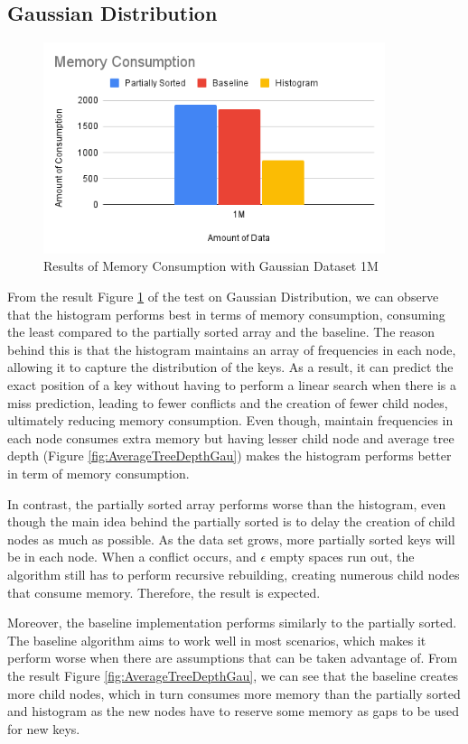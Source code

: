 \subsection{Gaussian Distribution}
\begin{figure}[H]
    \centering
    \includegraphics[width=100mm,scale=1]{Figures/MemoryGaussian.png}
    \caption{
     Results of Memory Consumption with Gaussian Dataset 1M
    }
    \label{fig:MemoryGaussian}
\end{figure}
From the result Figure \ref{fig:MemoryGaussian} of the test on Gaussian Distribution, we can observe that the histogram performs best in terms of memory consumption, consuming the least compared to the partially sorted array and the baseline. The reason behind this is that the histogram maintains an array of frequencies in each node, allowing it to capture the distribution of the keys. As a result, it can predict the exact position of a key without having to perform a linear search when there is a miss prediction, leading to fewer conflicts and the creation of fewer child nodes, ultimately reducing memory consumption. Even though, maintain frequencies in each node consumes extra memory but having lesser child node and average tree depth (Figure \ref{fig:AverageTreeDepthGau}) makes the histogram performs better in term of memory consumption.

In contrast, the partially sorted array performs worse than the histogram, even though the main idea behind the partially sorted is to delay the creation of child nodes as much as possible. As the data set grows, more partially sorted keys will be in each node. When a conflict occurs, and $\epsilon$ empty spaces run out, the algorithm still has to perform recursive rebuilding, creating numerous child nodes that consume memory. Therefore, the result is expected. 

Moreover, the baseline implementation performs similarly to the partially sorted. The baseline algorithm aims to work well in most scenarios, which makes it perform worse when there are assumptions that can be taken advantage of. From the result Figure \ref{fig:AverageTreeDepthGau}, we can see that the baseline creates more child nodes, which in turn consumes more memory than the partially sorted and histogram as the new nodes have to reserve some memory as \textsf{gaps} to be used for new keys.


